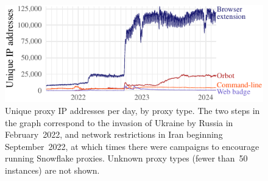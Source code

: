 \documentclass[letterpaper,twocolumn]{article}
\begin{document}
\begin{figure}
\includegraphics{figures/proxies/proxy-type}
\caption{
Unique proxy IP addresses per day,
by proxy type.
The two steps in the graph correspond
to the invasion of Ukraine by Russia in February~2022,
and network restrictions in Iran beginning September~2022,
at which times there were campaigns
to encourage running Snowflake proxies.
Unknown proxy types (fewer than~50 instances) are not shown.
}
\label{fig:proxy-type}
\end{figure}
\end{document}
